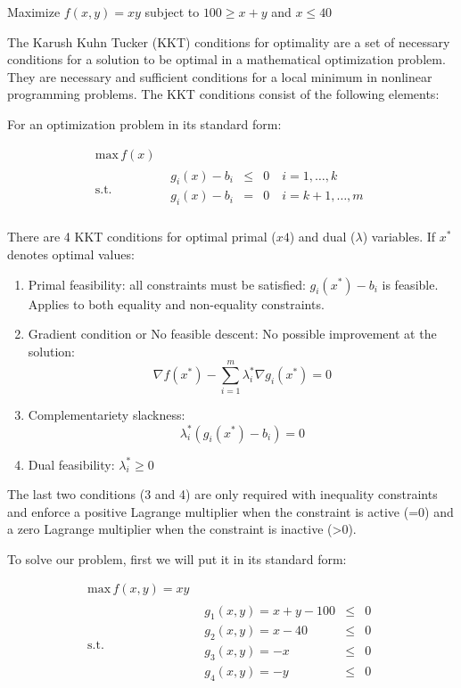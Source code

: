 \Exercise Maximize $f(x,y)=xy$ subject to $100 \geq x+y$ and $x\leq 40$

\Answer 

The Karush Kuhn Tucker (KKT) conditions  for optimality are a set of necessary conditions for a solution to be optimal in a mathematical optimization problem. They are necessary and sufficient conditions for a local minimum in nonlinear programming problems. The KKT conditions consist of the following elements:

For an optimization problem in its standard form:

\begin{equation*}
  \begin{aligned}
    \text{max} \, f(x) \\
    \text{s.t.}\quad &
    \begin{array}{rcl}
      g_i(x)-b_i  & \leq & 0 \quad i=1,\ldots,k \\
      g_i(x)-b_i  & = & 0 \quad i=k+1,\ldots,m \\
    \end{array}
  \end{aligned}
\end{equation*}

There are 4 KKT conditions for optimal primal ($x4$) and dual ($\lambda$) variables. If $x^*$ denotes optimal values:
\begin{enumerate}
  \item Primal feasibility: all constraints must be satisfied: $g_i(x^*)-b_i$ is feasible. Applies to both equality and non-equality constraints.
  \item Gradient condition or No feasible descent: No possible improvement at the solution: 
  \[ \nabla f(x^*)-\sum_{i=1}^m \lambda_i^* \nabla g_i (x^*)=0\]
  \item Complementariety slackness: 
  \[\lambda_i^* (g_i(x^*)-b_i)=0\]
  \item Dual feasibility: $\lambda_i^*\geq 0$
\end{enumerate}

The last two conditions (3 and 4) are only required with inequality constraints and enforce a positive Lagrange multiplier when the constraint is active (=0) and a zero Lagrange multiplier when the constraint is inactive (>0). 

To solve our problem, first we will put it in its standard form:


\begin{equation*}
  \begin{aligned}
    \text{max} \, f(x,y)=xy \\
    \text{s.t.}\quad &
    \begin{array}{rcl}
      g_1(x,y)=x+y-100  & \leq & 0  \\
      g_2(x,y)=x-40 & \leq & 0  \\
      g_3(x,y)=-x&\leq&0\\
      g_4(x,y)=-y&\leq&0\\
    \end{array}
  \end{aligned}
\end{equation*}

